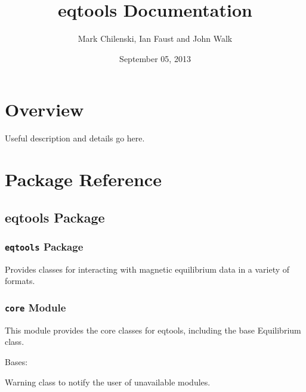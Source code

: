 \documentclass[letterpaper,10pt,english]{sphinxmanual}
\title{eqtools Documentation}
\date{September 05, 2013}
\author{Mark Chilenski, Ian Faust and John Walk}
\begin{document}
\maketitle
\tableofcontents
{}\label{index::doc}



\chapter{Overview}
\label{index:overview}\label{index:eqtools-tools-for-interacting-with-magnetic-equilibria}
Useful description and details go here.


\chapter{Package Reference}
\label{index:package-reference}

\section{eqtools Package}
\label{eqtools::doc}\label{eqtools:eqtools-package}

\subsection{\texttt{eqtools} Package}
\label{eqtools:id1}\label{eqtools:module-eqtools.__init__}
Provides classes for interacting with magnetic equilibrium data in a variety of formats.


\subsection{\texttt{core} Module}
\label{eqtools:module-eqtools.core}\label{eqtools:core-module}
This module provides the core classes for eqtools, including the base Equilibrium class.

\begin{fulllineitems}
\label{eqtools:eqtools.core.ModuleWarning}
Bases: 

Warning class to notify the user of unavailable modules.

\end{fulllineitems}

\end{document}
